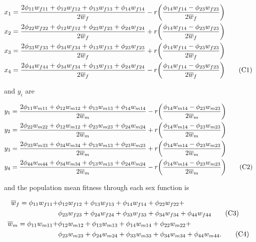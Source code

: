 \documentclass{article}
\newcommand\numberthis{\addtocounter{equation}{1}\tag{\theequation}}
\begin{document}
\begin{align*}
	x_1 &= \frac{2 \phi_{11} w_{f11} + \phi_{12} w_{f12} + \phi_{13} w_{f13} + \phi_{14} w_{f14}}{2 \overline{w}_f} -
				r \bigg( \frac{\phi_{14} w_{f14} - \phi_{23} w_{f23}} {2 \overline{w}_f} \bigg) \\
	x_2 &= \frac{2 \phi_{22} w_{f22} + \phi_{12} w_{f12} + \phi_{23} w_{f23} + \phi_{24} w_{f24}}{2 \overline{w}_f} +
				r \bigg( \frac{\phi_{14} w_{f14} - \phi_{23} w_{f23}} {2 \overline{w}_f} \bigg) \\ 
	x_3 &= \frac{2 \phi_{33} w_{f33} + \phi_{34} w_{f34} + \phi_{13} w_{f13} + \phi_{23} w_{f23}}{2 \overline{w}_f} +
				r \bigg( \frac{\phi_{14} w_{f14} - \phi_{23} w_{f23}} {2 \overline{w}_f} \bigg) \\
	x_4 &= \frac{2 \phi_{44} w_{f44} + \phi_{34} w_{f34} + \phi_{13} w_{f13} + \phi_{24} w_{f24}}{2 \overline{w}_f} -
				r \bigg( \frac{\phi_{14} w_{f14} - \phi_{23} w_{f23}} {2 \overline{w}_f} \bigg) \numberthis
\end{align*}

\noindent{} and $y_{i}$ are

\begin{align*}
	y_1 &= \frac{2 \phi_{11} w_{m11} + \phi_{12} w_{m12} + \phi_{13} w_{m13} + \phi_{14} w_{m14}}{2 \overline{w}_m} -
				r \bigg( \frac{\phi_{14} w_{m14} - \phi_{23} w_{m23}} {2 \overline{w}_m} \bigg) \\
	y_2 &= \frac{2 \phi_{22} w_{m22} + \phi_{12} w_{m12} + \phi_{23} w_{m23} + \phi_{24} w_{m24}}{2 \overline{w}_m} +
				r \bigg( \frac{\phi_{14} w_{m14} - \phi_{23} w_{m23}} {2 \overline{w}_m} \bigg) \\
	y_3 &= \frac{2 \phi_{33} w_{m33} + \phi_{34} w_{m34} + \phi_{13} w_{m13} + \phi_{23} w_{m23}}{2 \overline{w}_m} +
				r \bigg( \frac{\phi_{14} w_{m14} - \phi_{23} w_{m23}} {2 \overline{w}_m} \bigg) \\
	y_4 &= \frac{2 \phi_{44} w_{m44} + \phi_{34} w_{m34} + \phi_{13} w_{m13} + \phi_{24} w_{m24}}{2 \overline{w}_m} -
				r \bigg( \frac{\phi_{14} w_{m14} - \phi_{23} w_{m23}} {2 \overline{w}_m} \bigg) \numberthis
\end{align*}

\noindent{} and the population mean fitness through each sex function is

\begin{align*}
	\overline{w}_f = \phi_{11} w_{f11} + &\phi_{12} w_{f12} + \phi_{13} w_{f13} + \phi_{14} w_{f14} + \phi_{22} w_{f22} + \\ 
				     &\phi_{23} w_{f23} + \phi_{24} w_{f24} + \phi_{33} w_{f33} + \phi_{34} w_{f34} + \phi_{44} w_{f44} \numberthis \\
	\overline{w}_m = \phi_{11} w_{m11} + &\phi_{12} w_{m12} + \phi_{13} w_{m13} + \phi_{14} w_{m14} + \phi_{22} w_{m22} + \\
				     &\phi_{23} w_{m23} + \phi_{24} w_{m24} + \phi_{33} w_{m33} + \phi_{34} w_{m34} + \phi_{44} w_{m44}. \numberthis
\end{align*}
\end{document}
